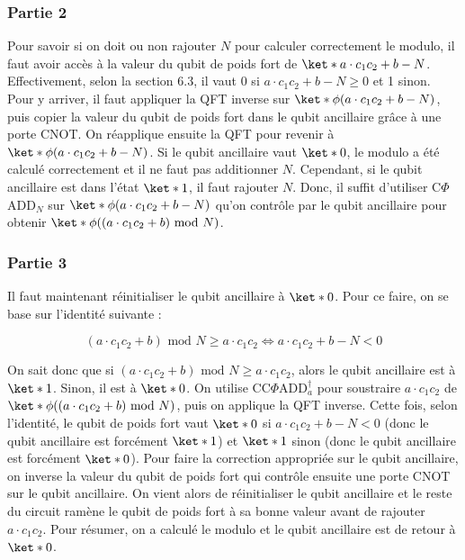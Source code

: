 \subsubsection*{Partie 2}
Pour savoir si on doit ou non rajouter $N$ pour calculer correctement le modulo, il faut avoir accès à la valeur du qubit de poids fort de $\ket*{a \cdot c_1c_2 + b - N}$. Effectivement, selon la section 6.3, il vaut 0 si $a \cdot c_1c_2 + b - N \geq 0$ et 1 sinon. Pour y arriver, il faut appliquer la QFT inverse sur $\ket*{\phi(a \cdot c_1c_2 + b - N)}$, puis copier la valeur du qubit de poids fort dans le qubit ancillaire grâce à une porte CNOT. On réapplique ensuite la QFT pour revenir à $\ket*{\phi(a \cdot c_1c_2 + b - N)}$. Si le qubit ancillaire vaut $\ket*{0}$, le modulo a été calculé correctement et il ne faut pas additionner $N$. Cependant, si le qubit ancillaire est dans l'état $\ket*{1}$, il faut rajouter $N$. Donc, il suffit d'utiliser C$\Phi$ADD$_N$ sur $\ket*{\phi(a \cdot c_1c_2 + b - N)}$ qu'on contrôle par le qubit ancillaire pour obtenir $\ket*{\phi((a \cdot c_1c_2 + b) \text{ mod } N)}$. 

\subsubsection*{Partie 3}
Il faut maintenant réinitialiser le qubit ancillaire à $\ket*{0}$. Pour ce faire, on se base sur l'identité suivante :

\begin{equation*}
    (a \cdot c_1 c_2 +b) \text{ mod } N \geq a \cdot c_1c_2 \iff a\cdot c_1c_2+b-N < 0
\end{equation*}
 
On sait donc que si $(a \cdot c_1 c_2 +b) \text{ mod } N \geq a \cdot c_1c_2$, alors le qubit ancillaire est à $\ket*{1}$. Sinon, il est à $\ket*{0}$. On utilise CC$\Phi$ADD$_a^\dag$ pour soustraire $a \cdot c_1c_2$ de $\ket*{\phi((a \cdot c_1c_2 + b) \text{ mod } N)}$, puis on applique la QFT inverse. Cette fois, selon l'identité, le qubit de poids fort vaut $\ket*{0}$ si $a\cdot c_1c_2+b-N < 0$ (donc le qubit ancillaire est forcément $\ket*{1}$) et $\ket*{1}$ sinon (donc le qubit ancillaire est forcément $\ket*{0}$). Pour faire la correction appropriée sur le qubit ancillaire, on inverse la valeur du qubit de poids fort qui contrôle ensuite une porte CNOT sur le qubit ancillaire. On vient alors de réinitialiser le qubit ancillaire et le reste du circuit ramène le qubit de poids fort à sa bonne valeur avant de rajouter $a \cdot c_1c_2$. Pour résumer, on a calculé le modulo et le qubit ancillaire est de retour à $\ket*{0}$.

